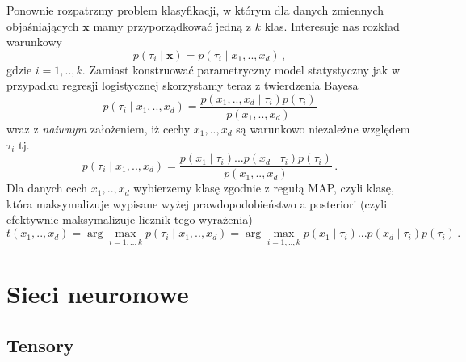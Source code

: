 \documentclass{myclass}
\begin{document}
Ponownie rozpatrzmy problem klasyfikacji, w którym dla danych zmiennych objaśniających
\(\mathbf{x}\) mamy przyporządkować jedną z \(k\) klas. Interesuje nas rozkład warunkowy
\begin{equation*}
    p(\tau_i \mid \mathbf{x}) = p(\tau_i \mid x_1,.., x_d)\,,
\end{equation*}
gdzie \(i = 1,..,k\). Zamiast konstruować parametryczny model statystyczny jak w przypadku regresji
logistycznej skorzystamy teraz z twierdzenia Bayesa
\begin{equation*}
    p(\tau_i \mid x_1, .., x_d) = \frac{p(x_1,..,x_d \mid \tau_i) p(\tau_i)}{p(x_1,..,x_d)}
\end{equation*}
wraz z \textit{naiwnym} założeniem, iż cechy \(x_1,..,x_d\) są warunkowo niezależne względem
\(\tau_i\) tj.
\begin{equation*}
    p(\tau_i \mid x_1, .., x_d) = \frac{p(x_1\mid \tau_i)...p(x_d \mid \tau_i) p(\tau_i)}{p(x_1,..,x_d)}\,.
\end{equation*}
Dla danych cech \(x_1,..,x_d\)  wybierzemy klasę zgodnie z regułą MAP, czyli klasę, która
maksymalizuje wypisane wyżej prawdopodobieństwo a posteriori (czyli efektywnie maksymalizuje licznik
tego wyrażenia)
\begin{equation*}
    t(x_1,..,x_d) = \arg\max_{i =1,..,k} p(\tau_i \mid x_1, .., x_d) = \arg\max_{i =1,..,k} p(x_1\mid \tau_i)...p(x_d \mid \tau_i) p(\tau_i)\,.
\end{equation*}


\linesep
\newpage
\section{Sieci neuronowe}

\subsection{Tensory}
\end{document}
